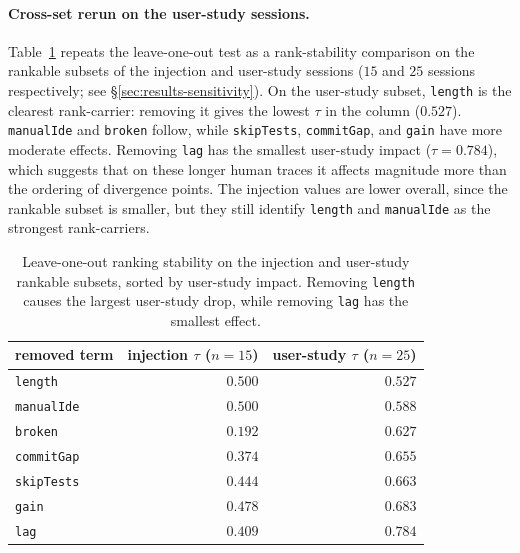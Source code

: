 \paragraph{Cross-set rerun on the user-study sessions.}
Table~\ref{tab:results-ablation-user-loo} repeats the leave-one-out test as a rank-stability comparison on the rankable subsets of the injection and user-study sessions ($15$ and $25$ sessions respectively; see §\ref{sec:results-sensitivity}). On the user-study subset, \texttt{length} is the clearest rank-carrier: removing it gives the lowest $\tau$ in the column ($0.527$). \texttt{manualIde} and \texttt{broken} follow, while \texttt{skipTests}, \texttt{commitGap}, and \texttt{gain} have more moderate effects. Removing \texttt{lag} has the smallest user-study impact ($\tau = 0.784$), which suggests that on these longer human traces it affects magnitude more than the ordering of divergence points. The injection values are lower overall, since the rankable subset is smaller, but they still identify \texttt{length} and \texttt{manualIde} as the strongest rank-carriers.

\begin{table}[htbp]
\centering
\small
\begin{tabular}{lrr}
\hline
\textbf{removed term} & \textbf{injection $\tau$ ($n=15$)} & \textbf{user-study $\tau$ ($n=25$)} \\
\hline
\texttt{length}    & $0.500$ & $\mathbf{0.527}$ \\
\texttt{manualIde} & $0.500$ & $0.588$ \\
\texttt{broken}    & $0.192$ & $0.627$ \\
\texttt{commitGap} & $0.374$ & $0.655$ \\
\texttt{skipTests} & $0.444$ & $0.663$ \\
\texttt{gain}      & $0.478$ & $0.683$ \\
\texttt{lag}       & $0.409$ & $0.784$ \\
\hline
\end{tabular}
\caption{Leave-one-out ranking stability on the injection and user-study rankable subsets, sorted by user-study impact. Removing \texttt{length} causes the largest user-study drop, while removing \texttt{lag} has the smallest effect.}
\label{tab:results-ablation-user-loo}
\end{table}

